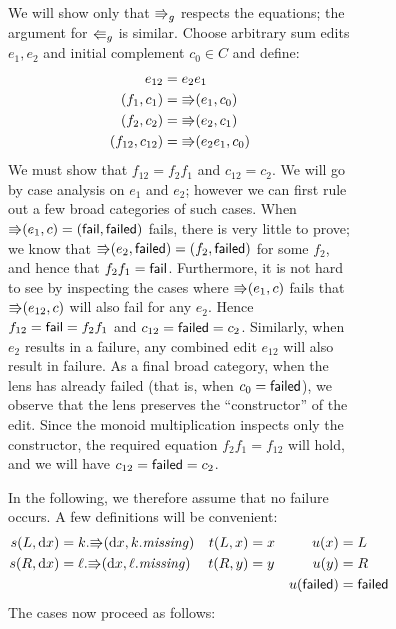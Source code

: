 \begin{figure}
\begin{figure}
\iffull
\begin{pf}
    We will show only that $\mathord{\Rrightarrow}_g$ respects the equations; the argument
    for $\mathord{\Lleftarrow}_g$ is similar. Choose arbitrary sum edits $e_1,e_2$ and
    initial complement $c_0 \in C$ and define:
    \begin{align*}
        e_{12} &= e_2e_1 \\
        (f_1,c_1) &= \mathord{\Rrightarrow}(e_1,c_0) \\
        (f_2,c_2) &= \mathord{\Rrightarrow}(e_2,c_1) \\
        (f_{12},c_{12}) &= \mathord{\Rrightarrow}(e_2e_1,c_0)
    \end{align*}
    We must show that $f_{12}=f_2f_1$ and $c_{12}=c_2$. We will go by case
    analysis on $e_1$ and $e_2$; however we can first rule out a few broad
    categories of such cases. When
    $\mathord{\Rrightarrow}(e_1,c)=(\mathsf{fail},\mathsf{failed})$ fails, there is very little to prove;
    we know that $\mathord{\Rrightarrow}(e_2,\mathsf{failed})=(f_2,\mathsf{failed})$ for some $f_2$, and
    hence that $f_2f_1=\mathsf{fail}$. Furthermore, it is not hard to see by
    inspecting the cases where $\mathord{\Rrightarrow}(e_1,c)$ fails that $\mathord{\Rrightarrow}(e_{12},c)$
    will also fail for any $e_2$. Hence $f_{12}=\mathsf{fail}=f_2f_1$ and
    $c_{12}=\mathsf{failed}=c_2$. Similarly, when $e_2$ results in a failure, any
    combined edit $e_{12}$ will also result in failure.  As a final broad
    category, when the lens has already failed (that is, when
    $c_0=\mathsf{failed}$), we observe that the lens preserves the ``constructor''
    of the edit. Since the monoid multiplication inspects only the
    constructor, the required equation $f_2f_1=f_{12}$ will hold, and we
    will have $c_{12}=\mathsf{failed}=c_2$.

    In the following, we therefore assume that no failure occurs.
    A few definitions will be convenient:  
    \begin{align*}
        s(L,\textrm{d} x)     &= k.\mathord{\Rrightarrow}(\textrm{d} x,k.\mathit{missing}) &
        t(L,x)       &=  x &
        u( x)  &= L \\
        s(R,\textrm{d} x)     &= \ell.\mathord{\Rrightarrow}(\textrm{d} x,\ell.\mathit{missing}) &
        t(R,y)       &=  y &
        u( y)  &= R \\
        &&&&
        u(\mathsf{failed}) &= \mathsf{failed}
    \end{align*}
    The cases now proceed as follows:
    \begin{trivlist}


\end{trivlist}
\end{pf}
\end{figure}
\end{figure}
